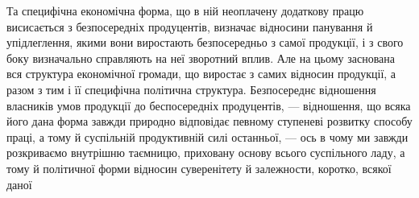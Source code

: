 Та специфічна економічна форма, що в ній неоплачену додаткову працю висисається
з безпосередніх продуцентів, визначає відносини панування й упідлеглення,
якими вони виростають безпосередньо з самої продукції, і з свого боку визначально
справляють на неї зворотний вплив. Але на цьому заснована вся структура економічної
громади, що виростає з самих відносин продукції, а разом з тим і її специфічна
політична структура. Безпосереднє відношення власників умов продукції
до беспосередніх продуцентів, — відношення, що всяка його дана форма завжди
природно відповідає певному ступеневі розвитку способу праці, а тому й суспільній
продуктивній силі останньої, — ось в чому ми завжди розкриваємо
внутрішню таємницю, приховану основу всього суспільного ладу, а тому й політичної
форми відносин суверенітету й залежности, коротко, всякої даної